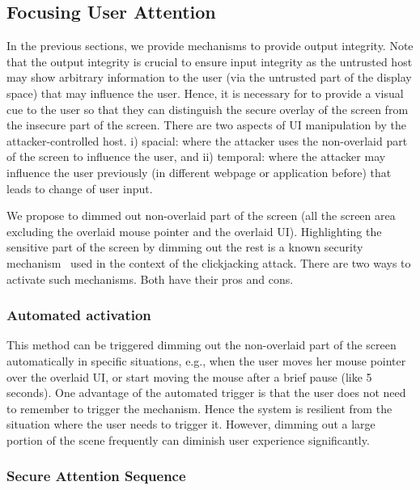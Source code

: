 \subsection{Focusing User Attention}
\label{sec:systemDesign:userAttention}

In the previous sections, we provide mechanisms to provide output integrity. Note that the output integrity is crucial to ensure input integrity as the untrusted host may show arbitrary information to the user (via the untrusted part of the display space) that may influence the user. Hence, it is necessary for \name to provide a visual cue to the user so that they can distinguish the secure overlay of the screen from the insecure part of the screen. There are two aspects of UI manipulation by the attacker-controlled host. i) spacial: where the attacker uses the non-overlaid part of the screen to influence the user, and ii) temporal: where the attacker may influence the user previously (in different webpage or application before) that leads to change of user input.

 We propose to dimmed out non-overlaid part of the screen (all the screen area excluding the overlaid mouse pointer and the overlaid UI). Highlighting the sensitive part of the screen by dimming out the rest is a known security mechanism~\cite{huang2012clickjacking} used in the context of the clickjacking attack. There are two ways to activate such mechanisms. Both have their pros and cons.


\subsubsection{\bfseries Automated activation}
\label{sec:systemDesign:userAttention:automated}

This method can be triggered dimming out the non-overlaid part of the screen automatically in specific situations, e.g., when the user moves her mouse pointer over the overlaid UI, or start moving the mouse after a brief pause (like 5 seconds). One advantage of the automated trigger is that the user does not need to remember to trigger the mechanism. Hence the system is resilient from the situation where the user needs to trigger it. However, dimming out a large portion of the scene frequently can diminish user experience significantly.   

\subsubsection{\bfseries Secure Attention Sequence}
\label{sec:systemDesign:userAttention:sas}

